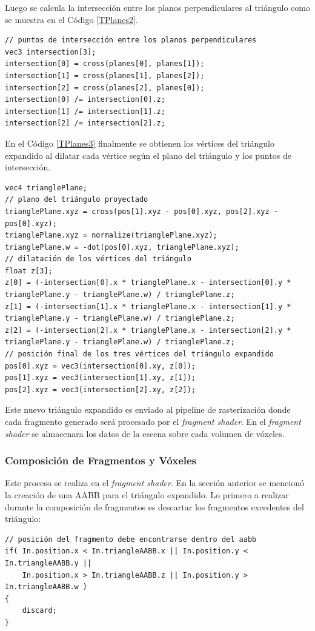Luego se calcula la intersección entre los planos perpendiculares al triángulo como se muestra en el Código \ref{TPlanes2}.
\\
\begin{lstlisting}[caption={Intersección entre planos perpendiculares al triángulo proyectado.}, label=TPlanes2]
// puntos de intersección entre los planos perpendiculares
vec3 intersection[3];
intersection[0] = cross(planes[0], planes[1]);
intersection[1] = cross(planes[1], planes[2]);
intersection[2] = cross(planes[2], planes[0]);
intersection[0] /= intersection[0].z;
intersection[1] /= intersection[1].z;
intersection[2] /= intersection[2].z;
\end{lstlisting}

En el Código \ref{TPlanes3} finalmente se obtienen los vértices del triángulo expandido al dilatar cada vértice según el plano del triángulo y los puntos de intersección.
\\
\begin{lstlisting}[caption={Vértices del triángulo expandido.}, label=TPlanes3]
vec4 trianglePlane;
// plano del triángulo proyectado
trianglePlane.xyz = cross(pos[1].xyz - pos[0].xyz, pos[2].xyz - pos[0].xyz);
trianglePlane.xyz = normalize(trianglePlane.xyz);
trianglePlane.w = -dot(pos[0].xyz, trianglePlane.xyz);
// dilatación de los vértices del triángulo
float z[3];
z[0] = (-intersection[0].x * trianglePlane.x - intersection[0].y * trianglePlane.y - trianglePlane.w) / trianglePlane.z;
z[1] = (-intersection[1].x * trianglePlane.x - intersection[1].y * trianglePlane.y - trianglePlane.w) / trianglePlane.z;
z[2] = (-intersection[2].x * trianglePlane.x - intersection[2].y * trianglePlane.y - trianglePlane.w) / trianglePlane.z;
// posición final de los tres vértices del triángulo expandido
pos[0].xyz = vec3(intersection[0].xy, z[0]);
pos[1].xyz = vec3(intersection[1].xy, z[1]);
pos[2].xyz = vec3(intersection[2].xy, z[2]);
\end{lstlisting}

Este nuevo triángulo expandido es enviado al pipeline de rasterización donde cada fragmento generado será procesado por el \emph{fragment shader}. En el \emph{fragment shader} se almacenara los datos de la escena sobre cada volumen de vóxeles.

\subsubsection{Composición de Fragmentos y Vóxeles}

Este proceso se realiza en el \emph{fragment shader}. En la sección anterior se mencionó la creación de una \ac{AABB} para el triángulo expandido. Lo primero a realizar durante la composición de fragmentos es descartar los fragmentos excedentes del triángulo:
\\
\begin{lstlisting}[caption={Descarte de fragmentos excedentes en el \emph{fragment shader}.}, label=TPlanes4]
// posición del fragmento debe encontrarse dentro del aabb
if( In.position.x < In.triangleAABB.x || In.position.y < In.triangleAABB.y || 
	In.position.x > In.triangleAABB.z || In.position.y > In.triangleAABB.w )
{
	discard;
}
\end{lstlisting}

